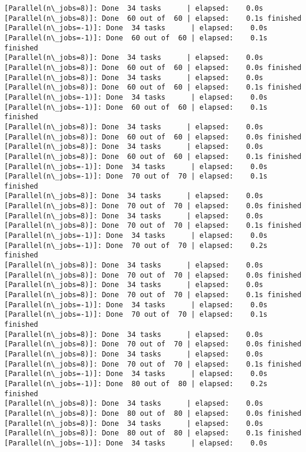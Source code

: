 \documentclass[11pt]{article}
\begin{document}
\begin{Verbatim}[commandchars=\\\{\}]
[Parallel(n\_jobs=8)]: Done  34 tasks      | elapsed:    0.0s
[Parallel(n\_jobs=8)]: Done  60 out of  60 | elapsed:    0.1s finished
[Parallel(n\_jobs=-1)]: Done  34 tasks      | elapsed:    0.0s
[Parallel(n\_jobs=-1)]: Done  60 out of  60 | elapsed:    0.1s finished
[Parallel(n\_jobs=8)]: Done  34 tasks      | elapsed:    0.0s
[Parallel(n\_jobs=8)]: Done  60 out of  60 | elapsed:    0.0s finished
[Parallel(n\_jobs=8)]: Done  34 tasks      | elapsed:    0.0s
[Parallel(n\_jobs=8)]: Done  60 out of  60 | elapsed:    0.1s finished
[Parallel(n\_jobs=-1)]: Done  34 tasks      | elapsed:    0.0s
[Parallel(n\_jobs=-1)]: Done  60 out of  60 | elapsed:    0.1s finished
[Parallel(n\_jobs=8)]: Done  34 tasks      | elapsed:    0.0s
[Parallel(n\_jobs=8)]: Done  60 out of  60 | elapsed:    0.0s finished
[Parallel(n\_jobs=8)]: Done  34 tasks      | elapsed:    0.0s
[Parallel(n\_jobs=8)]: Done  60 out of  60 | elapsed:    0.1s finished
[Parallel(n\_jobs=-1)]: Done  34 tasks      | elapsed:    0.0s
[Parallel(n\_jobs=-1)]: Done  70 out of  70 | elapsed:    0.1s finished
[Parallel(n\_jobs=8)]: Done  34 tasks      | elapsed:    0.0s
[Parallel(n\_jobs=8)]: Done  70 out of  70 | elapsed:    0.0s finished
[Parallel(n\_jobs=8)]: Done  34 tasks      | elapsed:    0.0s
[Parallel(n\_jobs=8)]: Done  70 out of  70 | elapsed:    0.1s finished
[Parallel(n\_jobs=-1)]: Done  34 tasks      | elapsed:    0.0s
[Parallel(n\_jobs=-1)]: Done  70 out of  70 | elapsed:    0.2s finished
[Parallel(n\_jobs=8)]: Done  34 tasks      | elapsed:    0.0s
[Parallel(n\_jobs=8)]: Done  70 out of  70 | elapsed:    0.0s finished
[Parallel(n\_jobs=8)]: Done  34 tasks      | elapsed:    0.0s
[Parallel(n\_jobs=8)]: Done  70 out of  70 | elapsed:    0.1s finished
[Parallel(n\_jobs=-1)]: Done  34 tasks      | elapsed:    0.0s
[Parallel(n\_jobs=-1)]: Done  70 out of  70 | elapsed:    0.1s finished
[Parallel(n\_jobs=8)]: Done  34 tasks      | elapsed:    0.0s
[Parallel(n\_jobs=8)]: Done  70 out of  70 | elapsed:    0.0s finished
[Parallel(n\_jobs=8)]: Done  34 tasks      | elapsed:    0.0s
[Parallel(n\_jobs=8)]: Done  70 out of  70 | elapsed:    0.1s finished
[Parallel(n\_jobs=-1)]: Done  34 tasks      | elapsed:    0.0s
[Parallel(n\_jobs=-1)]: Done  80 out of  80 | elapsed:    0.2s finished
[Parallel(n\_jobs=8)]: Done  34 tasks      | elapsed:    0.0s
[Parallel(n\_jobs=8)]: Done  80 out of  80 | elapsed:    0.0s finished
[Parallel(n\_jobs=8)]: Done  34 tasks      | elapsed:    0.0s
[Parallel(n\_jobs=8)]: Done  80 out of  80 | elapsed:    0.1s finished
[Parallel(n\_jobs=-1)]: Done  34 tasks      | elapsed:    0.0s

\end{Verbatim}
\end{document}
